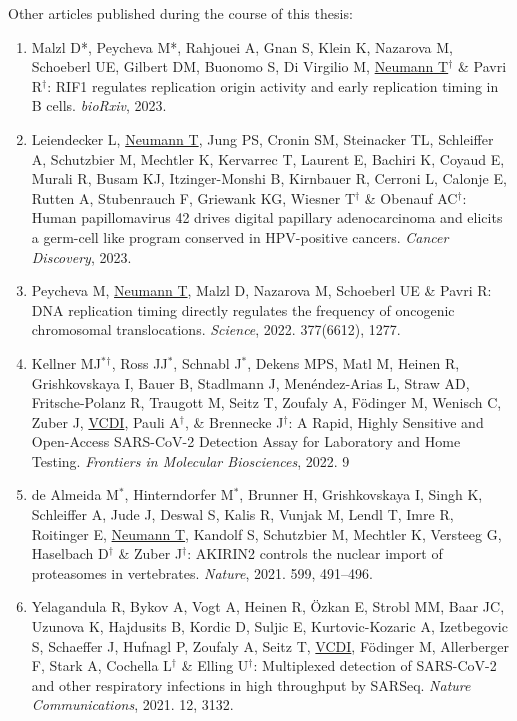 Other articles published during the course of this thesis:
\begin{enumerate}[label=\roman*)]
\item Malzl D*, Peycheva M*, Rahjouei A, Gnan S, Klein K, Nazarova M, Schoeberl UE, Gilbert DM, Buonomo S, Di Virgilio M, \underline{Neumann T$^{\dagger}$} \& Pavri R$^{\dagger}$: RIF1 regulates replication origin activity and early replication timing in B cells. \textit{bioRxiv}, 2023.
\item Leiendecker L, \underline{Neumann T}, Jung PS, Cronin SM, Steinacker  TL, Schleiffer A, Schutzbier M, Mechtler K, Kervarrec T, Laurent E, Bachiri K, Coyaud E, Murali R, Busam KJ, Itzinger-Monshi B, Kirnbauer R, Cerroni L, Calonje E, Rutten A, Stubenrauch F, Griewank KG, Wiesner T$^{\dagger}$ \& Obenauf AC$^{\dagger}$: Human papillomavirus 42 drives digital papillary adenocarcinoma and elicits a germ-cell like program conserved in HPV-positive cancers. \textit{Cancer Discovery}, 2023.
\item Peycheva M, \underline{Neumann T}, Malzl D, Nazarova M, Schoeberl UE \& Pavri R: DNA replication timing directly regulates the frequency of oncogenic chromosomal translocations. \textit{Science}, 2022. 377(6612), 1277.
\item Kellner MJ$^{*}$$^{\dagger}$, Ross JJ$^{*}$, Schnabl J$^{*}$, Dekens MPS, Matl M, Heinen R, Grishkovskaya I, Bauer B, Stadlmann J, Menéndez-Arias L, Straw AD, Fritsche-Polanz R, Traugott M, Seitz T, Zoufaly A, F{\"o}dinger M, Wenisch C, Zuber J, \underline{VCDI}, Pauli A$^{\dagger}$, \& Brennecke J$^{\dagger}$: A Rapid, Highly Sensitive and Open-Access SARS-CoV-2 Detection Assay for Laboratory and Home Testing. \textit{Frontiers in Molecular Biosciences}, 2022. 9
\item de Almeida M$^{*}$, Hinterndorfer M$^{*}$, Brunner H, Grishkovskaya I, Singh K, Schleiffer A, Jude J, Deswal S, Kalis R, Vunjak M, Lendl T, Imre R, Roitinger E, \underline{Neumann T}, Kandolf S, Schutzbier M, Mechtler K, Versteeg G, Haselbach D$^{\dagger}$ \& Zuber J$^{\dagger}$: AKIRIN2 controls the nuclear import of proteasomes in vertebrates. \textit{Nature}, 2021. 599, 491–496.
\item Yelagandula R, Bykov A, Vogt A, Heinen R, {\"O}zkan E, Strobl MM, Baar JC, Uzunova K, Hajdusits B, Kordic D, Suljic E, Kurtovic-Kozaric A, Izetbegovic S, Schaeffer J, Hufnagl P, Zoufaly A, Seitz T, \underline{VCDI}, F{\"o}dinger M, Allerberger F, Stark A, Cochella L$^{\dagger}$ \& Elling U$^{\dagger}$: Multiplexed detection of SARS-CoV-2 and other respiratory infections in high throughput by SARSeq. \textit{Nature Communications}, 2021. 12, 3132.
$$
\end{enumerate}
